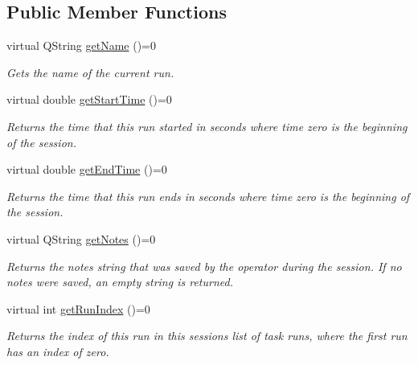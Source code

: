 \subsection*{Public Member Functions}
\begin{DoxyCompactItemize}
\item 
virtual Q\-String \hyperlink{class_picto_1_1_run_notes_reader_aa11971931900ca6456e1cd92891a2f05}{get\-Name} ()=0
\begin{DoxyCompactList}\small\item\em Gets the name of the current run. \end{DoxyCompactList}\item 
\hypertarget{class_picto_1_1_run_notes_reader_a988b8b115c76c1e4d92249c09541008f}{virtual double \hyperlink{class_picto_1_1_run_notes_reader_a988b8b115c76c1e4d92249c09541008f}{get\-Start\-Time} ()=0}\label{class_picto_1_1_run_notes_reader_a988b8b115c76c1e4d92249c09541008f}

\begin{DoxyCompactList}\small\item\em Returns the time that this run started in seconds where time zero is the beginning of the session. \end{DoxyCompactList}\item 
\hypertarget{class_picto_1_1_run_notes_reader_a91ae3ae21960bbb583b31341e6b6dd9f}{virtual double \hyperlink{class_picto_1_1_run_notes_reader_a91ae3ae21960bbb583b31341e6b6dd9f}{get\-End\-Time} ()=0}\label{class_picto_1_1_run_notes_reader_a91ae3ae21960bbb583b31341e6b6dd9f}

\begin{DoxyCompactList}\small\item\em Returns the time that this run ends in seconds where time zero is the beginning of the session. \end{DoxyCompactList}\item 
\hypertarget{class_picto_1_1_run_notes_reader_ac4fd0456fee5ef31b026aa5404cfdb33}{virtual Q\-String \hyperlink{class_picto_1_1_run_notes_reader_ac4fd0456fee5ef31b026aa5404cfdb33}{get\-Notes} ()=0}\label{class_picto_1_1_run_notes_reader_ac4fd0456fee5ef31b026aa5404cfdb33}

\begin{DoxyCompactList}\small\item\em Returns the notes string that was saved by the operator during the session. If no notes were saved, an empty string is returned. \end{DoxyCompactList}\item 
\hypertarget{class_picto_1_1_run_notes_reader_ad065e80b6ba051bf5218e82cb45f225d}{virtual int \hyperlink{class_picto_1_1_run_notes_reader_ad065e80b6ba051bf5218e82cb45f225d}{get\-Run\-Index} ()=0}\label{class_picto_1_1_run_notes_reader_ad065e80b6ba051bf5218e82cb45f225d}

\begin{DoxyCompactList}\small\item\em Returns the index of this run in this sessions list of task runs, where the first run has an index of zero. \end{DoxyCompactList}\end{DoxyCompactItemize}


